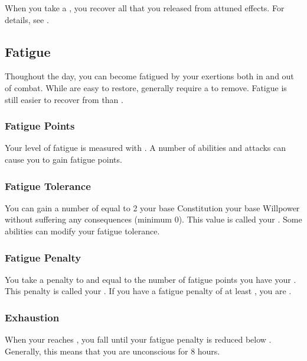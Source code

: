         When you take a , you recover all  that you released from attuned effects.
        For details, see .

    \subsection{Fatigue}\label{Fatigue}
        Thoughout the day, you can become fatigued by your exertions both in and out of combat.
        While  are easy to restore,  generally require a  to remove.
        Fatigue is still easier to recover from than .

        \subsubsection{Fatigue Points}\label{Fatigue Points}
            Your level of fatigue is measured with .
            A number of abilities and attacks can cause you to gain fatigue points.

            \subsubsection{Fatigue Tolerance}\label{Fatigue Tolerance}
                You can gain a number of  equal to 2 \add your base Constitution \add your base Willpower without suffering any consequences (minimum 0).
                This value is called your .
                Some abilities can modify your fatigue tolerance.

            \subsubsection{Fatigue Penalty}\label{Fatigue Penalty}
                You take a penalty to  and  equal to the number of fatigue points you have \sub your .
                This penalty is called your .
                If you have a fatigue penalty of at least , you are .

        \subsubsection{Exhaustion}\label{Exhaustion}
            When your  reaches , you fall  until your fatigue penalty is reduced below .
            Generally, this means that you are unconscious for 8 hours.


